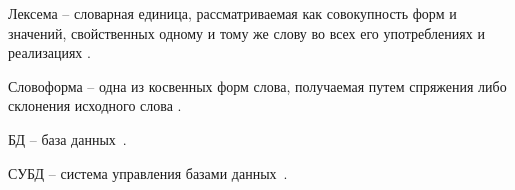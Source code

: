 
Лексема -- словарная единица, рассматриваемая как совокупность форм и значений, свойственных одному и тому же слову во всех его употреблениях и реализациях \cite{ibatova-lexema-2020}.

Словоформа -- одна из косвенных форм слова, получаемая путем спряжения либо склонения исходного слова \cite{ibatova-lexema-2020}.

БД -- база данных~\cite{karpova-db-textbook-2009}.

СУБД -- система управления базами данных~\cite{karpova-db-textbook-2009}.